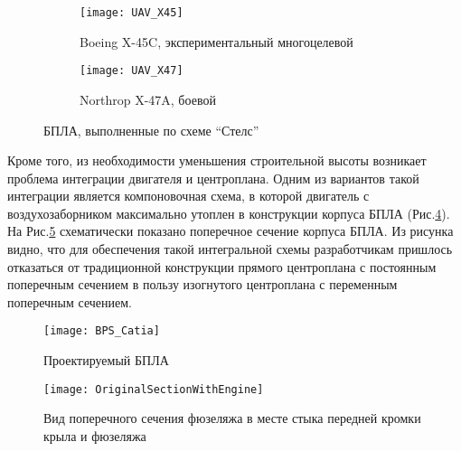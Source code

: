 \begin{figure}[ht]
        \begin{subfigure}[b]{0.47\textwidth}
                \texttt{[image: UAV\_X45]}
                \caption{Boeing X-45C, экспериментальный многоцелевой}
                \label{fig:UAV_X45}
        \end{subfigure}%
        \hspace{\fill}
        \begin{subfigure}[b]{0.47\textwidth}
                \texttt{[image: UAV\_X47]}
                \caption{Northrop X-47A, боевой} %
                \label{fig:UAV_X47}
        \end{subfigure}%
        \caption{БПЛА, выполненные по схеме ``Стелс''}\label{fig:UAVs_stealth}
\end{figure}

Кроме того, из необходимости уменьшения строительной высоты возникает проблема интеграции двигателя и центроплана. Одним из вариантов такой интеграции является компоновочная схема, в которой двигатель с воздухозаборником максимально утоплен в конструкции корпуса БПЛА (Рис.\ref{fig:BPS}). На Рис.\ref{fig:OriginalSectionWithEngine} схематически показано поперечное сечение корпуса БПЛА. Из рисунка видно, что для обеспечения такой интегральной схемы разработчикам пришлось отказаться от традиционной конструкции прямого центроплана с постоянным поперечным сечением в пользу изогнутого центроплана с переменным поперечным сечением.



\begin{figure}[ht]
\centering
\texttt{[image: BPS\_Catia]}
\caption{Проектируемый БПЛА}
\label{fig:BPS}
\end{figure}




\begin{figure}[ht]
\captionsetup{justification=centering}
\centering
\texttt{[image: OriginalSectionWithEngine]}
%
\caption{Вид поперечного сечения фюзеляжа в месте стыка передней кромки крыла и фюзеляжа}
\label{fig:OriginalSectionWithEngine}
\end{figure}



